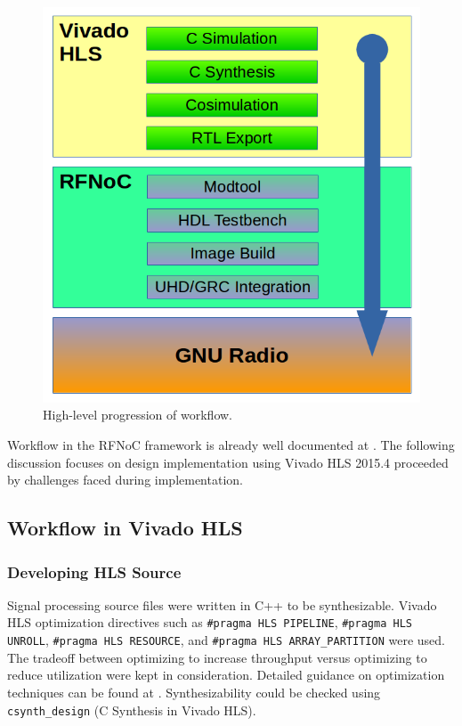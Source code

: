\documentclass{article}
\begin{document}
\begin{figure}[h]
  \begin{center}
    \centerline{\includegraphics[width=\columnwidth]{workflow.png}}
    \caption{High-level progression of workflow.}
    \label{workflow}
  \end{center}
\end{figure}

Workflow in the RFNoC framework is already well documented at \cite{rfnockb}. The following discussion focuses on design implementation using Vivado HLS 2015.4 proceeded by challenges faced during implementation.

\subsection{Workflow in Vivado HLS}

\subsubsection*{Developing HLS Source}
Signal processing source files were written in C++ to be synthesizable. Vivado HLS optimization directives such as {\tt \#pragma HLS PIPELINE}, {\tt \#pragma HLS UNROLL}, {\tt \#pragma HLS RESOURCE}, and {\tt \#pragma HLS ARRAY\_PARTITION} were used. The tradeoff between optimizing to increase throughput versus optimizing to reduce utilization were kept in consideration. Detailed guidance on optimization techniques can be found at \cite{ug902}. Synthesizability could be checked using {\tt csynth\_design} (C Synthesis in Vivado HLS).
\end{document}
